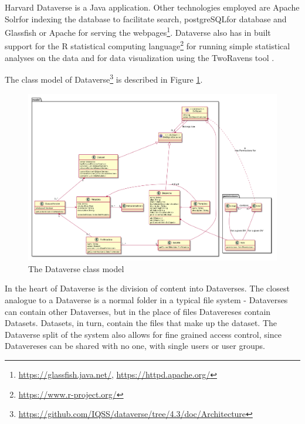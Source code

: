 Harvard Dataverse is a Java application. Other technologies employed are Apache
Solr for indexing the database to facilitate search,
postgreSQL for database
and Glassfish or Apache for serving the
webpages\footnote{\url{https://glassfish.java.net/}, \url{https://httpd.apache.org/}}.
Dataverse also has in built support for the R statistical computing
language\footnote{\url{https://www.r-project.org/}} for running simple
statistical analyses on the data and for data visualization using the
TwoRavens tool \cite{DBLP:conf/ht/HonakerD14}.

The class model of
Dataverse\footnote{\label{architecture}\url{https://github.com/IQSS/dataverse/tree/4.3/doc/Architecture}}
is described in Figure \ref{fig:dataverse-model}.

\begin{figure}
    \begin{centering}
        \includegraphics[width=\textwidth]{images/dataverse-model}
    \end{centering}
    \caption[The Dataverse class model]{The Dataverse class model}
    \label{fig:dataverse-model}
\end{figure}

In the heart of Dataverse is the division of content into Dataverses. The
closest analogue to a Dataverse is a normal folder in a typical file system -
Dataverses can contain other Dataverses, but in the place of files Datavereses
contain Datasets. Datasets, in turn, contain the files that make up the
dataset. The Dataverse split of the system also allows for fine grained access
control, since Datavereses can be shared with no one, with single users or user
groups.

